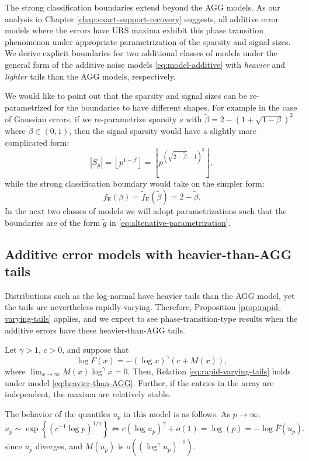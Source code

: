 The strong classification boundaries extend beyond the AGG models.
As our analysis in Chapter \ref{chap:exact-support-recovery} suggests, all additive error models where the errors have URS maxima exhibit this phase transition phenomenon under appropriate parametrization of the sparsity and signal sizes.
We derive explicit boundaries for two additional classes of models under the general form of the additive noise models \eqref{eq:model-additive} with 
{\em heavier} and {\em lighter} tails than the AGG models, respectively. 

We would like to point out that the sparsity and signal sizes can be re-parametrized for the boundaries to have different shapes.
For example in the case of Gaussian errors, if we re-parametrize sparsity $s$ with 
$\widetilde{\beta} = 2 - \left(1 + \sqrt{1-\beta}\right)^2$ where $\widetilde{\beta}\in(0,1)$, then the signal sparsity would have a slightly more complicated form:
$$
\left|S_p\right| = \left\lfloor p^{1-\beta} \right\rfloor = \left\lfloor p^{\left(\sqrt{2 - \widetilde{\beta}} - 1\right)^2}\right\rfloor,
$$
while the strong classification boundary would take on the simpler form:
\begin{equation}\label{eq:altenative-parametrization}
f_{\mathrm{E}}(\beta) = \widetilde{f}_{\mathrm{E}}(\widetilde{\beta}) = 2 - \widetilde{\beta}.
\end{equation}
In the next two classes of models we will adopt parametrizations such that the boundaries are of the form $\widetilde{g}$ in \eqref{eq:altenative-parametrization}.

\subsection{Additive error models with heavier-than-AGG tails}

Distributions such as the log-normal have heavier tails than the AGG model, yet the tails are nevertheless rapidly-varying. 
Therefore, Proposition \ref{prop:rapid-varying-tails} applies, and we expect to see phase-transition-type results when the additive errors have these heavier-than-AGG tails.

\begin{example} \label{exmp:heavier-than-AGG}
Let $\gamma>1$, $c>0$, and suppose that
\begin{equation} \label{eq:heavier-than-AGG}
    \log{\overline{F}(x)} = - \left(\log x\right)^\gamma \left(c+M(x)\right),
\end{equation}
where $\lim_{x\to\infty} M(x)\log^\gamma{x}= 0$. Then, Relation \eqref{eq:rapid-varying-tails} holds under 
model \eqref{eq:heavier-than-AGG}. Further, if the entries in the array are independent, the 
maxima are relatively stable.

The behavior of the quantiles $u_p$ in this model is as follows. As $p\to\infty,$
\begin{equation*}
    u_p \sim \exp{\left\{\left(c^{-1}\log{p}\right)^{1/\gamma}\right\}}
    \iff c\left(\log{u_p}\right)^{\gamma} + o(1) = \log(p) = - \log \overline{F}(u_p).
\end{equation*}
since $u_p$ diverges, and $M(u_p)$ is $o((\log^\gamma u_p)^{-1})$.
\end{example}


